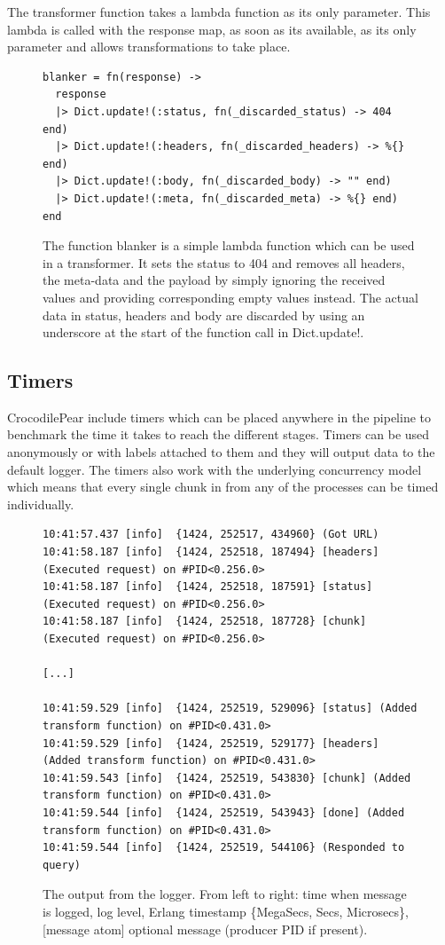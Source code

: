 \documentclass{cslthse-msc}
\begin{document}
The transformer function takes a lambda function as its only parameter. This lambda is called with the response map, as soon as its available, as its only parameter and allows transformations to take place.

\begin{figure}[H]
  \centering
\begin{lstlisting}[breaklines=true,frame=single]
blanker = fn(response) ->
  response
  |> Dict.update!(:status, fn(_discarded_status) -> 404 end)
  |> Dict.update!(:headers, fn(_discarded_headers) -> %{} end)
  |> Dict.update!(:body, fn(_discarded_body) -> "" end)
  |> Dict.update!(:meta, fn(_discarded_meta) -> %{} end)
end
\end{lstlisting}
  \caption{The function blanker is a simple lambda function which can be used in a transformer. It sets the status to 404 and removes all headers, the meta-data and the payload by simply ignoring the received values and providing corresponding empty values instead. The actual data in status, headers and body are discarded by using an underscore at the start of the function call in Dict.update!.}
\end{figure}

\subsection{Timers}
CrocodilePear include timers which can be placed anywhere in the pipeline to benchmark the time it takes to reach the different stages. Timers can be used anonymously or with labels attached to them and they will output data to the default logger. The timers also work with the underlying concurrency model which means that every single chunk in from any of the processes can be timed individually.

\begin{figure}[H]
  \centering
\begin{lstlisting}[breaklines=true,frame=single]
10:41:57.437 [info]  {1424, 252517, 434960} (Got URL)
10:41:58.187 [info]  {1424, 252518, 187494} [headers] (Executed request) on #PID<0.256.0>
10:41:58.187 [info]  {1424, 252518, 187591} [status] (Executed request) on #PID<0.256.0>
10:41:58.187 [info]  {1424, 252518, 187728} [chunk] (Executed request) on #PID<0.256.0>

[...]

10:41:59.529 [info]  {1424, 252519, 529096} [status] (Added transform function) on #PID<0.431.0>
10:41:59.529 [info]  {1424, 252519, 529177} [headers] (Added transform function) on #PID<0.431.0>
10:41:59.543 [info]  {1424, 252519, 543830} [chunk] (Added transform function) on #PID<0.431.0>
10:41:59.544 [info]  {1424, 252519, 543943} [done] (Added transform function) on #PID<0.431.0>
10:41:59.544 [info]  {1424, 252519, 544106} (Responded to query)
\end{lstlisting}
  \caption{The output from the logger. From left to right: time when message is logged, log level, Erlang timestamp \{MegaSecs, Secs, Microsecs\}, [message atom] optional message (producer PID if present).}
\end{figure}
\end{document}
